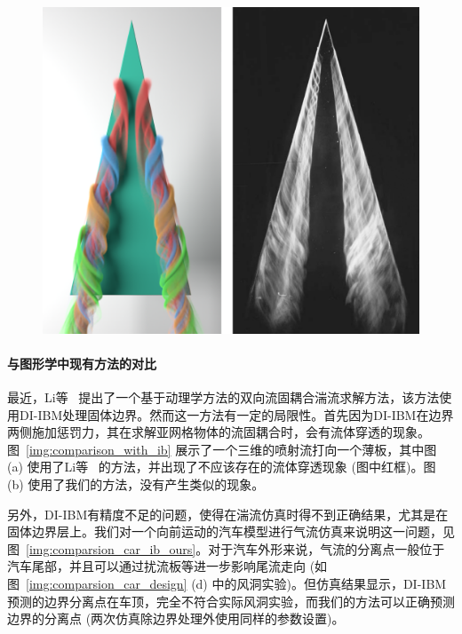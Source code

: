 \begin{figure}[!htb]
  \centering
    \includegraphics[width=0.99\columnwidth]{figures/comparison_delta_wing.png}
  \label{img:comparison_delta_wing}
\end{figure}

\paragraph{与图形学中现有方法的对比}
最近，Li等~\citeyear{Li-2020} 提出了一个基于动理学方法的双向流固耦合湍流求解方法，该方法使用DI-IBM处理固体边界。然而这一方法有一定的局限性。首先因为DI-IBM在边界两侧施加惩罚力，其在求解亚网格物体的流固耦合时，会有流体穿透的现象。图~\ref{img:comparison_with_ib} 展示了一个三维的喷射流打向一个薄板，其中图 (a) 使用了Li等~\citeyear{Li-2020} 的方法，并出现了不应该存在的流体穿透现象 (图中红框)。图 (b) 使用了我们的方法，没有产生类似的现象。

另外，DI-IBM有精度不足的问题，使得在湍流仿真时得不到正确结果，尤其是在固体边界层上。我们对一个向前运动的汽车模型进行气流仿真来说明这一问题，见图~\ref{img:comparsion_car_ib_ours}。对于汽车外形来说，气流的分离点一般位于汽车尾部，并且可以通过扰流板等进一步影响尾流走向 (如图~\ref{img:comparsion_car_design} (d) 中的风洞实验)。但仿真结果显示，DI-IBM预测的边界分离点在车顶，完全不符合实际风洞实验，而我们的方法可以正确预测边界的分离点 (两次仿真除边界处理外使用同样的参数设置)。

